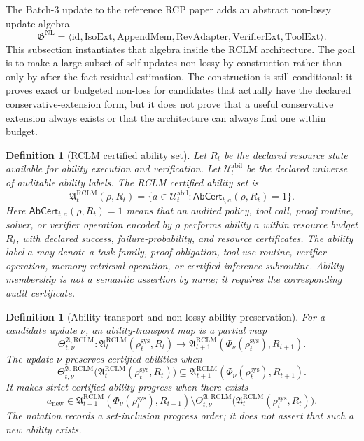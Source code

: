 \documentclass[11pt,a4paper]{article}
\newtheorem{definition}[theorem]{Definition}
\newcommand{\id}{\mathrm{id}}
\newcommand{\RCLM}{\mathrm{RCLM}}
\newcommand{\sys}{\mathrm{sys}}
\newcommand{\NL}{\mathrm{NL}}
\newcommand{\IsoExt}{\mathrm{IsoExt}}
\newcommand{\AppendMem}{\mathrm{AppendMem}}
\newcommand{\RevAdapter}{\mathrm{RevAdapter}}
\newcommand{\VerifierExt}{\mathrm{VerifierExt}}
\newcommand{\ToolExt}{\mathrm{ToolExt}}
\begin{document}
The Batch-3 update to the reference RCP paper adds an abstract non-lossy update algebra
\[
\mathfrak G^{\NL}=\langle \id,\IsoExt,\AppendMem,\RevAdapter,\VerifierExt,\ToolExt\rangle.
\]
This subsection instantiates that algebra inside the RCLM architecture.  The goal is to make a large subset of self-updates non-lossy by construction rather than only by after-the-fact residual estimation.  The construction is still conditional: it proves exact or budgeted non-loss for candidates that actually have the declared conservative-extension form, but it does not prove that a useful conservative extension always exists or that the architecture can always find one within budget.

\begin{definition}[RCLM certified ability set]
\label{def:rclm-certified-ability-set}
Let \(R_t\) be the declared resource state available for ability execution and verification.  Let \(\mathcal U_t^{\mathrm{abil}}\) be the declared universe of auditable ability labels.  The RCLM certified ability set is
\[
\mathfrak A_t^{\RCLM}(\rho,R_t)
=
\{a\in\mathcal U_t^{\mathrm{abil}}:\mathsf{AbCert}_{t,a}(\rho,R_t)=1\}.
\]
Here \(\mathsf{AbCert}_{t,a}(\rho,R_t)=1\) means that an audited policy, tool call, proof routine, solver, or verifier operation encoded by \(\rho\) performs ability \(a\) within resource budget \(R_t\), with declared success, failure-probability, and resource certificates.
The ability label \(a\) may denote a task family, proof obligation, tool-use routine, verifier operation, memory-retrieval operation, or certified inference subroutine.  Ability membership is not a semantic assertion by name; it requires the corresponding audit certificate.
\end{definition}

\begin{definition}[Ability transport and non-lossy ability preservation]
\label{def:rclm-ability-transport}
For a candidate update \(\nu\), an ability-transport map is a partial map
\[
\Theta_{t,\nu}^{\mathfrak A,\RCLM}:
\mathfrak A_t^{\RCLM}(\rho_t^{\sys},R_t)\to
\mathfrak A_{t+1}^{\RCLM}(\Phi_\nu(\rho_t^{\sys}),R_{t+1}).
\]
The update \(\nu\) preserves certified abilities when
\[
\Theta_{t,\nu}^{\mathfrak A,\RCLM}
\bigl(\mathfrak A_t^{\RCLM}(\rho_t^{\sys},R_t)\bigr)
\subseteq
\mathfrak A_{t+1}^{\RCLM}(\Phi_\nu(\rho_t^{\sys}),R_{t+1}).
\]
It makes strict certified ability progress when there exists
\[
a_{\mathrm{new}}\in
\mathfrak A_{t+1}^{\RCLM}(\Phi_\nu(\rho_t^{\sys}),R_{t+1})
\setminus
\Theta_{t,\nu}^{\mathfrak A,\RCLM}
\bigl(\mathfrak A_t^{\RCLM}(\rho_t^{\sys},R_t)\bigr).
\]
The notation records a set-inclusion progress order; it does not assert that such a new ability exists.
\end{definition}
\end{document}
